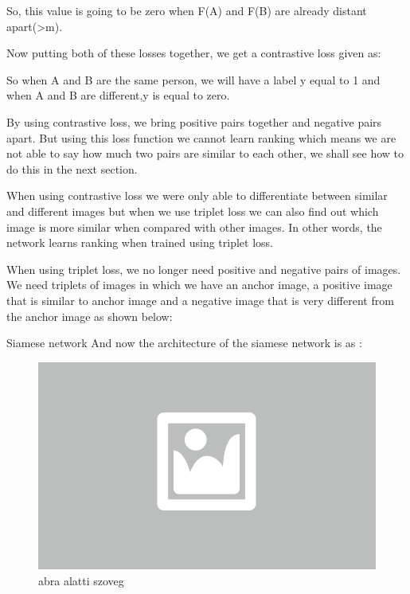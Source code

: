 
So, this value is going to be zero when F(A) and F(B) are already distant apart(>m).

Now putting both of these losses together, we get a contrastive loss given as:


So when A and B are the same person, we will have a label y equal to 1 and when A and B are different,y is equal to zero.

By using contrastive loss, we bring positive pairs together and negative pairs apart. But using this loss function we cannot learn ranking which means we are not able to say how much two pairs are similar to each other, we shall see how to do this in the next section.


When using contrastive loss we were only able to differentiate between similar
and different images but when we use triplet loss we can also find out which
image is more similar when compared with other images. In other words, the
network learns ranking when trained using triplet loss.

When using triplet loss, we no longer need positive and negative pairs of
images. We need triplets of images in which we have an anchor image, a positive
image that is similar to anchor image and a negative image that is very
different from the anchor image as shown below:

Siamese network And now the architecture of the siamese network is as :

\begin{figure}[ht]
	\centering
	\includegraphics[width=0.65\columnwidth]{figures/abra.png}
	\caption{abra alatti szoveg}
\end{figure}

